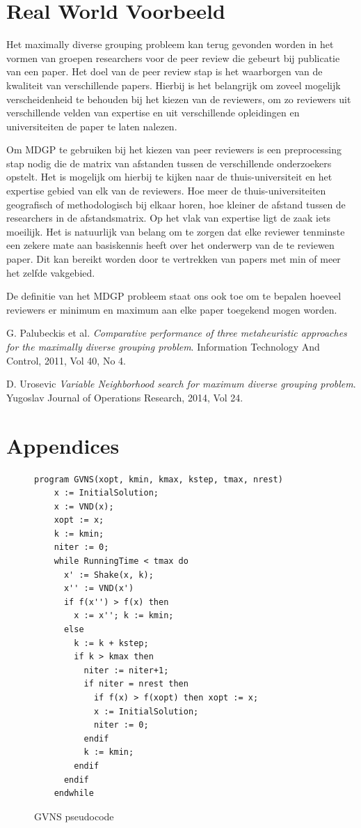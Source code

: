 \documentclass[pdftex,12pt,a4paper]{article}
\begin{document}
\section{Real World Voorbeeld}

Het maximally diverse grouping probleem kan terug gevonden worden in het vormen van groepen researchers voor de peer review die gebeurt bij publicatie van een paper. Het doel van de peer review stap is het waarborgen van de kwaliteit van verschillende papers. Hierbij is het belangrijk om zoveel mogelijk verscheidenheid te behouden bij het kiezen van de reviewers, om zo reviewers uit verschillende velden van expertise en uit verschillende opleidingen en universiteiten de paper te laten nalezen.

Om MDGP te gebruiken bij het kiezen van peer reviewers is een preprocessing stap nodig die de matrix van afstanden tussen de verschillende onderzoekers opstelt. Het is mogelijk om hierbij te kijken naar de thuis-universiteit en het expertise gebied van elk van de reviewers. Hoe meer de thuis-universiteiten geografisch of methodologisch bij elkaar horen, hoe kleiner de afstand tussen de researchers in de afstandsmatrix. Op het vlak van expertise ligt de zaak iets moeilijk. Het is natuurlijk van belang om te zorgen dat elke reviewer tenminste een zekere mate aan basiskennis heeft over het onderwerp van de te reviewen paper. Dit kan bereikt worden door te vertrekken van papers met min of meer het zelfde vakgebied.

De definitie van het MDGP probleem staat ons ook toe om te bepalen hoeveel reviewers er minimum en maximum aan elke paper toegekend mogen worden. 

\newpage
\begin{thebibliography}{9}
  G. Palubeckis et al.
  \emph{Comparative performance of three metaheuristic approaches
for the maximally diverse grouping problem}.
  Information Technology And Control, 2011, Vol 40, No 4.
  
 D. Urosevic
 \emph{Variable Neighborhood search for maximum diverse grouping problem}.
 Yugoslav Journal of Operations Research, 2014, Vol 24.

\end{thebibliography}

\section{Appendices}
\begin{figure}[H]
\begin{verbatim}
program GVNS(xopt, kmin, kmax, kstep, tmax, nrest)
    x := InitialSolution;
    x := VND(x);
    xopt := x;
    k := kmin;
    niter := 0;
    while RunningTime < tmax do
      x' := Shake(x, k);
      x'' := VND(x')
      if f(x'') > f(x) then
        x := x''; k := kmin;
      else
        k := k + kstep;
        if k > kmax then
          niter := niter+1;
          if niter = nrest then
            if f(x) > f(xopt) then xopt := x;
            x := InitialSolution;
            niter := 0;
          endif
          k := kmin;
        endif
      endif
    endwhile
\end{verbatim}
\caption{GVNS pseudocode}
\label{apx:gvns_pseudocode}
\end{figure}
\end{document}
